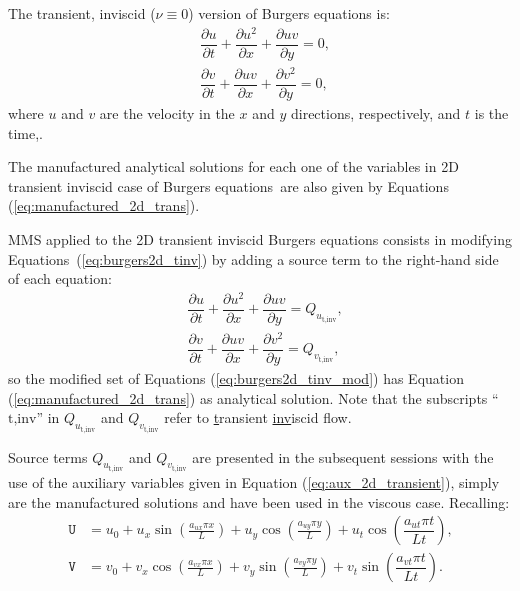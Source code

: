 \documentclass[10pt]{article}
\newcommand{\diff}[2] {\dfrac{\partial #1}{\partial #2}}
\newcommand{\U}{\,\mathtt{U}}
\newcommand{\V}{\,\mathtt{V}}
\begin{document}
The transient, inviscid ($\nu\equiv 0$) version of Burgers equations is:
\begin{equation}
 \label{eq:burgers2d_tinv}
\begin{split}
 &\diff{ u}{t} + \diff{ u^2 }{x}+\diff{uv}{y}=0,\\
&\diff{ v}{t}+ \diff{ u v}{x} + \diff{  v^2 }{y}=0,
\end{split}
\end{equation}
%
where $u$ and $v$ are the velocity in the  $x$ and $y$  directions, respectively, and $t$ is the time,.


The manufactured analytical solutions for each one of the variables in 2D transient inviscid case of Burgers equations~are also given by Equations (\ref{eq:manufactured_2d_trans}). 

MMS applied to the 2D transient inviscid Burgers equations consists in modifying Equations~(\ref{eq:burgers2d_tinv}) by adding a source term to the right-hand side of each equation:
\begin{equation}
 \label{eq:burgers2d_tinv_mod}
\begin{split}
 &\diff{ u}{t} + \diff{ u^2 }{x}+\diff{uv}{y}= Q_{u_\text{t,inv}},\\
&\diff{ v}{t}+ \diff{ u v}{x} + \diff{  v^2 }{y}=Q_{v_\text{t,inv}},
\end{split}
\end{equation}
so the modified set of Equations (\ref{eq:burgers2d_tinv_mod}) has Equation (\ref{eq:manufactured_2d_trans}) as analytical solution. Note that the subscripts ``$\text{t,inv}$'' in $Q_{u_\text{t,inv}}$ and $Q_{v_\text{t,inv}}$  refer to \underline{t}ransient \underline{inv}iscid flow.


Source terms $Q_{u_\text{t,inv}}$ and $Q_{v_\text{t,inv}}$ are presented in the subsequent sessions with the use of the auxiliary variables given in Equation (\ref{eq:aux_2d_transient}), simply are the manufactured solutions and have been used in the viscous case. Recalling:
\begin{equation*}
 \begin{split}
\label{eq:aux_2d_transient_recall}
\U &= u_{0}+u_{x} \sin\left(\frac{a_{u x} \pi x}{L}\right)+u_{y} \cos\left(\frac{a_{u y} \pi y}{L}\right) + u_t \cos\left(\dfrac{a_{u t} \pi t}{Lt}\right),\\
\V &= v_{0}+v_{x} \cos\left(\frac{a_{v x} \pi x}{L}\right)+v_{y} \sin\left(\frac{a_{v y} \pi y}{L}\right)+ v_t \sin\left(\dfrac{a_{v t} \pi t}{Lt}\right).
\end{split}
\end{equation*}
%
\end{document}
